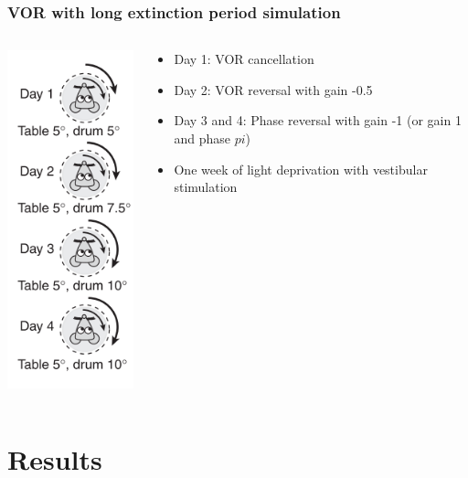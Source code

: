 \documentclass[10pt, compress]{beamer}
\begin{document}
\begin{frame}[fragile]
  \frametitle{VOR with long extinction period simulation}
  \begin{columns}[T]
    \begin{column}[T]{5cm}
      \includegraphics[scale=0.4]{images/vvor.png}
    \end{column}
    \begin{column}[T]{5cm}
      \begin{itemize}
        \item Day 1: VOR cancellation
        \item Day 2: VOR reversal with gain -0.5
        \item Day 3 and 4: Phase reversal with gain -1 (or gain 1 and phase $pi$)
        \item One week of light deprivation with vestibular stimulation
      \end{itemize}
    \end{column}
  \end{columns}
\end{frame}


\section{Results}
\end{document}
